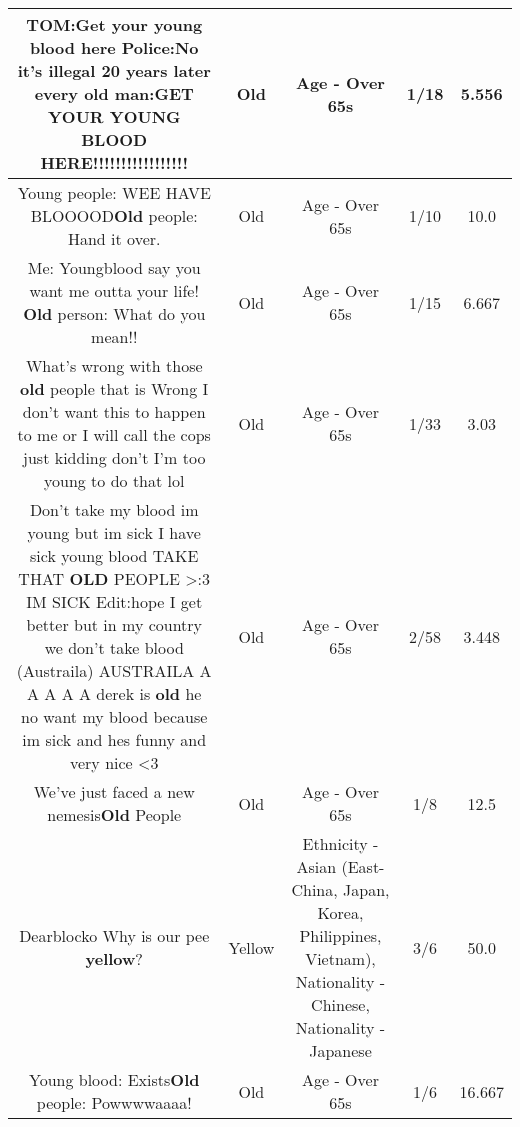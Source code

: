 \documentclass[11pt]{article}
\newlength\mylength
\begin{document}
\begin{center}
\begin{longtable}{|C{.65\mylength}|C{.30\mylength}|C{.12\mylength}|C{.12\mylength}|C{.12\mylength}|}
  \small TOM:Get your young blood here     Police:No it's illegal          20 years later every \textbf{old} man:GET YOUR YOUNG BLOOD HERE!!!!!!!!!!!!!!!!!\normalsize   & Old & Age - Over 65s & 1/18 & 5.556 \\  \hline
  \small Young people: WEE HAVE BLOOOOD\textbf{Old} people: Hand it over.\normalsize   & Old & Age - Over 65s & 1/10 & 10.0 \\  \hline
  \small Me: Youngblood say you want me outta your life! \textbf{Old} person: What do you mean!!\normalsize   & Old & Age - Over 65s & 1/15 & 6.667 \\  \hline
  \small What's wrong with those \textbf{old} people that is Wrong I don't want this to happen to me or I will call the cops just kidding don't I'm too young to do that lol\normalsize   & Old & Age - Over 65s & 1/33 & 3.03 \\  \hline
  \small Don't take my blood im young but im sick I have sick young blood TAKE THAT \textbf{OLD} PEOPLE >:3 IM SICK   Edit:hope I get better but in my country we don't take blood (Austraila) AUSTRAILA A A A A A derek is \textbf{old} he no want my blood because im sick and hes funny and very nice <3\normalsize   & Old & Age - Over 65s & 2/58 & 3.448 \\  \hline
  \small We've just faced a new nemesis\textbf{Old} People\normalsize   & Old & Age - Over 65s & 1/8 & 12.5 \\  \hline
  \small Dearblocko Why is our pee \textbf{y\textbf{e\textbf{llow}}}?\normalsize   & Yellow & Ethnicity - Asian (East- China, Japan, Korea, Philippines, Vietnam), Nationality - Chinese, Nationality - Japanese & 3/6 & 50.0 \\  \hline
  \small Young blood: Exists\textbf{Old} people: Powwwwaaaa!\normalsize   & Old & Age - Over 65s & 1/6 & 16.667 \\  \hline

\end{longtable}
\end{center}
\end{document}
